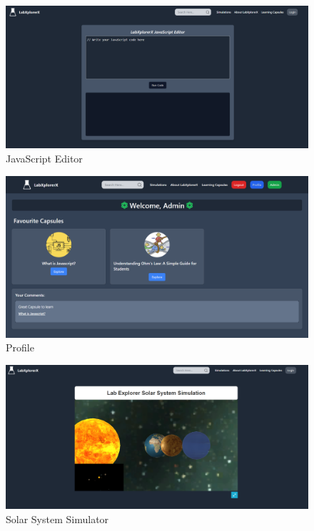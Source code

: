  \begin{figure}[H]
    \centering
     \includegraphics[width = 16cm]{Diagrams/output/js.png}
     \caption{JavaScript Editor}
 \end{figure}
 \begin{figure}[H]
    \centering
     \includegraphics[width = 16cm]{Diagrams/output/profile.png}
     \caption{Profile}
 \end{figure}
 \begin{figure}[H]
    \centering
     \includegraphics[width = 16cm]{Diagrams/output/solar.png}
     \caption{Solar System Simulator}
 \end{figure}
